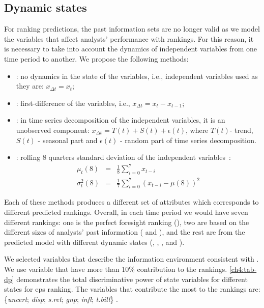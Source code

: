 \documentclass[a4paper,twoside,12pt,openright,notitlepage]{report}\usepackage[]{graphicx}\usepackage[]{color}
\begin{document}
\subsection{Dynamic states}
For ranking predictions, the past  information sets   are no longer valid as we model the variables that affect analysts' performance  with \tr{} rankings. For this reason, it is necessary to take into account the dynamics of independent variables from one time period to another. We propose the following methods:
\begin{itemize}
	\item \last{}: no dynamics in the state of the  variables, i.e., independent variables used as they are: $x_{\Delta{t}}=x_{t}$;
	\item  \diff{}: first-difference  of the variables, i.e., $x_{\Delta{t}}=x_t-x_{t-1}$;
	\item  \random{}: in time series decomposition of the independent variables, it is an unobserved component: $x_{\Delta{t}}=T(t)+S(t)+\epsilon (t)$, where $T(t)$- trend, $S(t)$ - seasonal part and $\epsilon (t)$ - random part of time series decomposition.
	\item  \rollsd{}: rolling 8 quarters standard deviation of the independent variables~\citep{zivot2003}:
	\begin{eqnarray}
		\mu_t(8)&=&\frac{1}{8}\sum_{i=0}^7 x_{t-i} \nonumber \\
		\sigma^2_t(8)&=&\frac{1}{7}\sum_{i=0}^7 (x_{t-i}-\mu(8))^2
	\end{eqnarray}

\end{itemize}
Each of these methods produces a different set of attributes which corresponds to different predicted rankings. Overall, in each time period we would have seven different rankings: one is the perfect foresight ranking (\tr{}), two are based on the different sizes of analysts' past information (\naive{} and ), and the rest are from the predicted model with different dynamic states (\last{},  \diff{}, \random{}, and  \rollsd{}).


We selected  variables that describe the information environment consistent with \cite{aiguzhinov2015b}. We use variable that have more than 10\% contribution to the rankings. \ref{ch4:tab-dp} demonstrates the total discriminative power of state variables for different states for \gls{eps} ranking. The variables that contribute the most to the rankings are:
\{\emph{uncert}; \emph{disp}; \emph{s.ret}; \emph{gnp}; \emph{infl}; \emph{t.bill}\}
.
\end{document}
